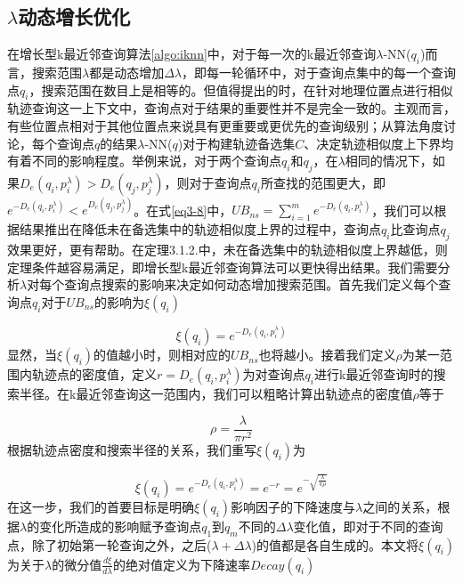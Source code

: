\subsection{$\lambda$动态增长优化}
\label{subsec:lambda}
在增长型k最近邻查询算法\ref{algo:iknn}中，对于每一次的k最近邻查询$\lambda$-NN($q_{i}$)而言，搜索范围$\lambda$都是动态增加$\Delta\lambda$，即每一轮循环中，对于查询点集中的每一个查询点$q_{i}$，搜索范围在数目上是相等的。但值得提出的时，在针对地理位置点进行相似轨迹查询这一上下文中，查询点对于结果的重要性并不是完全一致的。主观而言，有些位置点相对于其他位置点来说具有更重要或更优先的查询级别；从算法角度讨论，每个查询点$q$的结果$\lambda$-NN($q$)对于构建轨迹备选集$C$、决定轨迹相似度上下界均有着不同的影响程度。举例来说，对于两个查询点$q_{i}$和$q_{j}$，在$\lambda$相同的情况下，如果$D_{e}(q_{i}, p_{i}^{\lambda}) > D_{e}(q_{j}, p_{j}^{\lambda})$，则对于查询点$q_{i}$所查找的范围更大，即$e^{-D_{e}(q_{i}, p_{i}^{\lambda})} < e^{D_{e}(q_{j}, p_{j}^{\lambda})}$。在式\ref{eq3-8}中，$UB_{ns} = \sum_{i=1}^{m}e^{-D_{e}(q_{i}, p_{i}^{\lambda})}$，我们可以根据结果推出在降低未在备选集中的轨迹相似度上界的过程中，查询点$q_{i}$比查询点$q_{j}$效果更好，更有帮助。在定理3.1.2.中，未在备选集中的轨迹相似度上界越低，则定理条件越容易满足，即增长型k最近邻查询算法可以更快得出结果。我们需要分析$\lambda$对每个查询点搜索的影响来决定如何动态增加搜索范围。首先我们定义每个查询点$q_i$对于$UB_{ns}$的影响为$\xi (q_i)$

\begin{displaymath}
	\xi (q_i) = e^{-D_{e}(q_i,p_i^\lambda)}
\end{displaymath}
显然，当$\xi (q_i)$的值越小时，则相对应的$UB_{ns}$也将越小。接着我们定义$\rho$为某一范围内轨迹点的密度值，定义$r=D_{e}(q_i,p_i^\lambda)$为对查询点$q_i$进行k最近邻查询时的搜索半径。在k最近邻查询这一范围内，我们可以粗略计算出轨迹点的密度值$\rho$等于

\begin{displaymath}
	\rho = \frac{\lambda}{\pi r^{2}}
\end{displaymath}
根据轨迹点密度和搜索半径的关系，我们重写$\xi (q_i)$为

\begin{displaymath}
	\xi (q_i) = e^{-D_{e}(q_i,p_i^\lambda)} = e^{-r} = e^{-\sqrt{\frac{\lambda}{\pi\rho}}}
\end{displaymath}
在这一步，我们的首要目标是明确$\xi (q_i)$影响因子的下降速度与$\lambda$之间的关系，根据$\lambda$的变化所造成的影响赋予查询点$q_1$到$q_m$不同的$\Delta\lambda$变化值，即对于不同的查询点，除了初始第一轮查询之外，之后($\lambda+\Delta\lambda$)的值都是各自生成的。本文将$\xi (q_i)$为关于$\lambda$的微分值$\frac{d\xi}{d\lambda}$的绝对值定义为下降速率$Decay(q_i)$

